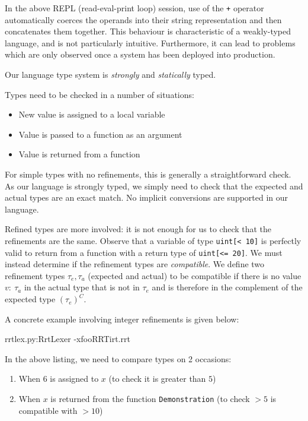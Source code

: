 \documentclass[a4paper,openany,12pt]{book}
\begin{document}
In the above REPL (read-eval-print loop) session, use of the \texttt{+} operator automatically coerces the operands
into their string representation and then concatenates them together.
This behaviour is characteristic of a weakly-typed language, and is not particularly intuitive.
Furthermore, it can lead to problems which are only observed once a system has been deployed into production.

Our language type system is \emph{strongly} and \emph{statically} typed.


Types need to be checked in a number of situations:

\begin{itemize}
    \item New value is assigned to a local variable
    \item Value is passed to a function as an argument
    \item Value is returned from a function
\end{itemize}

For simple types with no refinements, this is generally a straightforward check.
As our language is strongly typed, we simply need to check that the expected and actual types are an exact match.
No implicit conversions are supported in our language.

Refined types are more involved: it is not enough for us to check that the refinements are the same.
Observe that a variable of type \texttt{uint[< 10]} is perfectly valid to return from a function with a return type of
\texttt{uint[<= 20]}.
We must instead determine if the refinement types are \emph{compatible}.
We define two refinement types $\tau_e, \tau_a$ (expected and actual) to be compatible if there is no value $v:~\tau_a$
in the actual type that is not in $\tau_e$ and is therefore in the complement of the expected type $(\tau_e)^C$.

A concrete example involving integer refinements is given below:

\begin{mycodefile}{rrtlex.py:RrtLexer -x}{foo}{RRT}{irt.rrt}\end{mycodefile}

In the above listing, we need to compare types on 2 occasions:

\begin{enumerate}
    \item When $6$ is assigned to $x$ (to check it is greater than $5$)
    \item When $x$ is returned from the function \texttt{Demonstration} (to check $> 5$ is compatible with $> 10$)
\end{enumerate}
\end{document}
